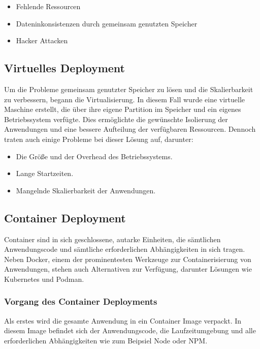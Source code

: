 \begin{itemize}
    \item Fehlende Ressourcen
    \item Dateninkonsistenzen durch gemeinsam genutzten Speicher
    \item Hacker Attacken
\end{itemize}


\cite{Verschiedene_Deployment_Arten}    


\subsection{Virtuelles Deployment}

Um die Probleme gemeinsam genutzter Speicher zu lösen und die Skalierbarkeit zu verbessern, begann die Virtualisierung. In diesem Fall wurde eine virtuelle Maschine erstellt, die über ihre eigene Partition im Speicher und ein eigenes Betriebssystem verfügte. Dies ermöglichte die gewünschte Isolierung der Anwendungen und eine bessere Aufteilung der verfügbaren Ressourcen. Dennoch traten auch einige Probleme bei dieser Lösung auf, darunter:

\begin{itemize}
\item Die Größe und der Overhead des Betriebssystems.
\item  Lange Startzeiten.
\item  Mangelnde Skalierbarkeit der Anwendungen.
\end{itemize}

\cite{Virtuelles_Deployment}

\subsection{Container Deployment}

Container sind in sich geschlossene, autarke Einheiten, die sämtlichen Anwendungscode und sämtliche erforderlichen Abhängigkeiten in sich tragen. Neben Docker, einem der prominentesten Werkzeuge zur Containerisierung von Anwendungen, stehen auch Alternativen zur Verfügung, darunter Lösungen wie Kubernetes und Podman.

\subsubsection{Vorgang des Container Deployments}

Als erstes wird die gesamte Anwendung in ein Container Image verpackt. In diesem Image befindet sich der Anwendungscode, die Laufzeitumgebung und alle erforderlichen Abhängigkeiten wie zum Beipsiel Node oder NPM.

